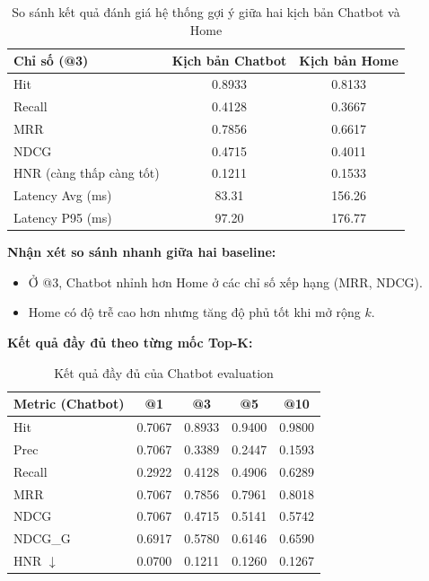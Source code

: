 \begin{table}[H]
\centering
\begin{tabular}{|l|c|c|}
\hline
\textbf{Chỉ số (@3)} & \textbf{Kịch bản Chatbot} & \textbf{Kịch bản Home} \\
\hline
Hit & 0.8933 & 0.8133 \\
\hline
Recall & 0.4128 & 0.3667 \\
\hline
MRR & 0.7856 & 0.6617 \\
\hline
NDCG & 0.4715 & 0.4011 \\
\hline
HNR (càng thấp càng tốt) & 0.1211 & 0.1533 \\
\hline
Latency Avg (ms) & 83.31 & 156.26 \\
\hline
Latency P95 (ms) & 97.20 & 176.77 \\
\hline
\end{tabular}
\caption{So sánh kết quả đánh giá hệ thống gợi ý giữa hai kịch bản Chatbot và Home}
\label{tab:rec_comparison}
\end{table}

\noindent\textbf{Nhận xét so sánh nhanh giữa hai baseline:}
\begin{itemize}
    \item Ở @3, Chatbot nhỉnh hơn Home ở các chỉ số xếp hạng (MRR, NDCG).
    \item Home có độ trễ cao hơn nhưng tăng độ phủ tốt khi mở rộng $k$.
\end{itemize}

\textbf{Kết quả đầy đủ theo từng mốc Top-K:}

\begin{table}[H]
\centering
\begin{tabular}{|l|c|c|c|c|}
\hline
\textbf{Metric (Chatbot)} & \textbf{@1} & \textbf{@3} & \textbf{@5} & \textbf{@10} \\
\hline
Hit & 0.7067 & 0.8933 & 0.9400 & 0.9800 \\
\hline
Prec & 0.7067 & 0.3389 & 0.2447 & 0.1593 \\
\hline
Recall & 0.2922 & 0.4128 & 0.4906 & 0.6289 \\
\hline
MRR & 0.7067 & 0.7856 & 0.7961 & 0.8018 \\
\hline
NDCG & 0.7067 & 0.4715 & 0.5141 & 0.5742 \\
\hline
NDCG\_G & 0.6917 & 0.5780 & 0.6146 & 0.6590 \\
\hline
HNR $\downarrow$ & 0.0700 & 0.1211 & 0.1260 & 0.1267 \\
\hline
\end{tabular}
\caption{Kết quả đầy đủ của Chatbot evaluation}
\label{tab:chatbot_full_metrics}
\end{table}

